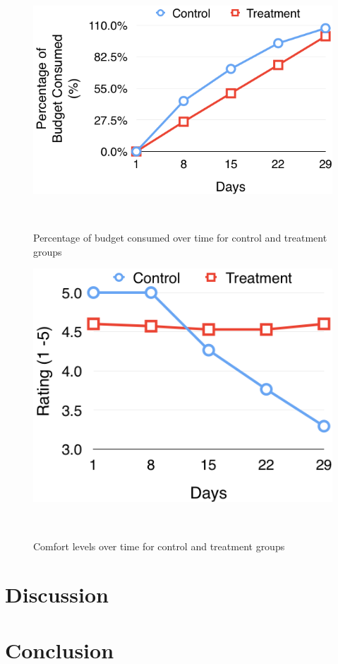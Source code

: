 \documentclass{sigchi}
\begin{document}
\begin{figure}
\centering
  \includegraphics[width=0.9\columnwidth]{figures/budget}
  \caption{Percentage of budget consumed over time for control and treatment groups}~\label{fig:figure2}
\end{figure}

\begin{figure}
\centering
  \includegraphics[width=0.9\columnwidth]{figures/comfort}
  \caption{Comfort levels over time for control and treatment groups}~\label{fig:figure3}
\end{figure}

\section{Discussion}

\section{Conclusion}

\balance{}



\end{document}
